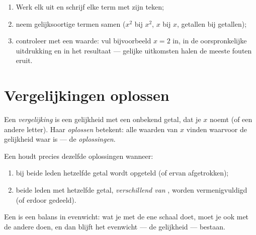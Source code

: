 \begin{method}\label{met:g8:equations:reduce}
\begin{enumerate}
  \item Werk elk  uit en schrijf elke term met zijn teken;
  \item neem gelijksoortige termen samen ($x^2$ bij $x^2$, $x$ bij $x$, getallen
        bij getallen);
  \item controleer met een waarde: vul bijvoorbeeld $x = 2$ in, in de
        oorspronkelijke uitdrukking en in het resultaat --- gelijke uitkomsten
        halen de meeste fouten eruit.
\end{enumerate}
\end{method}

\section{Vergelijkingen oplossen}

\begin{definition}[Vergelijking]\label{def:g8:equations:def}
Een \emph{vergelijking} is een gelijkheid met een onbekend
getal, dat je $x$ noemt (of een andere letter). Haar \emph{oplossen} betekent:
alle waarden van $x$ vinden waarvoor de gelijkheid waar is --- de
\emph{oplossingen}.
\end{definition}

\begin{theorem}[Balansregels]\label{thm:g8:equations:balance}
Een  houdt precies dezelfde oplossingen wanneer:
\begin{enumerate}
  \item bij beide leden hetzelfde getal wordt opgeteld (of ervan afgetrokken);
  \item beide leden met hetzelfde getal, \emph{verschillend van }, worden
        vermenigvuldigd (of erdoor gedeeld).
\end{enumerate}
\end{theorem}
\admitted

\begin{omfigure}

{\small Een  is een balans in evenwicht: wat je met de ene schaal
doet, moet je ook met de andere doen, en dan blijft het evenwicht --- de
gelijkheid --- bestaan.}
\end{omfigure}

